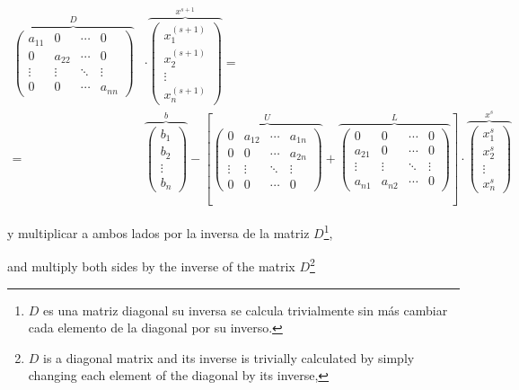 \begin{align*}
\overbrace{\begin{pmatrix}
a_{11}& 0& \cdots & 0\\
0& a_{22}& \cdots & 0\\
\vdots & \vdots & \ddots & \vdots\\
0& 0& \cdots & a_{nn}
\end{pmatrix}}^D &\cdot \overbrace{\begin{pmatrix}
x_1^{(s+1)}\\
x_2^{(s+1)}\\
\vdots \\
x_n^{(s+1)}
\end{pmatrix}}^{x^{s+1}}=&\\
=&\overbrace{\begin{pmatrix}
b_1\\
b_2\\
\vdots \\
b_n
\end{pmatrix}}^b-\left[
\overbrace{\begin{pmatrix}
0& a_{12}& \cdots & a_{1n}\\
0& 0& \cdots & a_{2n}\\
\vdots & \vdots & \ddots & \vdots\\
0& 0& \cdots & 0
\end{pmatrix}}^U+
\overbrace{\begin{pmatrix}
0& 0& \cdots & 0\\
a_{21}& 0& \cdots & 0\\
\vdots & \vdots & \ddots & \vdots\\
a_{n1}& a_{n2}& \cdots & 0
\end{pmatrix}}^L \right] \cdot \overbrace{\begin{pmatrix}
x_1^s\\
x_2^s\\
\vdots \\
x_n^s
\end{pmatrix}}^{x^s}
\end{align*}

\begin{paracol}{2}
 y multiplicar a ambos lados por la inversa de la matriz $D$\footnote{$D$ es una matriz diagonal su inversa se calcula trivialmente sin más cambiar cada elemento de la diagonal por su inverso.},
 
\switchcolumn
 and multiply both sides by the inverse of the matrix $D$\footnote{$D$ is a diagonal matrix and its inverse is trivially calculated by simply changing each element of the diagonal by its inverse,}
\end{paracol}

